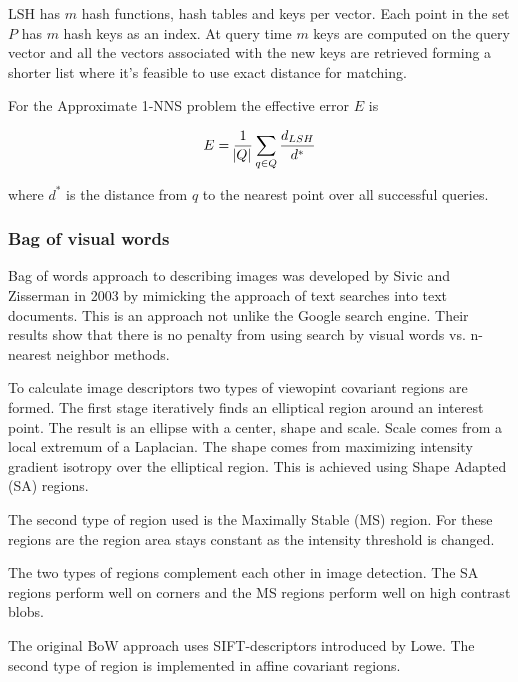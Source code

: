 \documentclass[english,12pt,a4paper,pdftex,elec,utf8]{aaltothesis}
\begin{document}
LSH has $m$ hash functions, hash tables and keys per vector. Each point in the set $P$ has $m$ hash keys as an index. At query time $m$ keys are computed on the query vector and all the vectors associated with the new keys are retrieved forming a shorter list where it's feasible to use exact distance for matching.





For the Approximate 1-NNS problem the effective error $E$ is

\begin{equation}
  \label{lsherroreq}
E = \frac{1}{\abs{Q}}\sum_{q\in Q}\frac{d_{LSH}}{d^*}
  \end{equation}

where $d^*$ is the distance from $q$ to the nearest point over all successful queries.


\subsubsection{Bag of visual words}\label{BOW}
Bag of words approach to describing images was developed by Sivic and Zisserman in 2003 by mimicking the approach of text searches into text documents. This is an approach not unlike the Google search engine. Their results show that there is no penalty from using search by visual words vs. n-nearest neighbor methods.\cite{Sivic2003}

To calculate image descriptors two types of viewopint covariant regions are formed. The first stage iteratively finds an elliptical region around an interest point. The result is an ellipse with a center, shape and scale. Scale comes from a local extremum of a Laplacian. The shape comes from maximizing intensity gradient isotropy over the elliptical region. This is achieved using Shape Adapted (SA) regions.\cite{Sivic2003}

The second type of region used is the Maximally Stable (MS) region. For these regions are the region area stays constant as the intensity threshold is changed.

The two types of regions complement each other in image detection. The SA regions perform well on corners and the MS regions perform well on high contrast blobs. \cite{Sivic2003}

The original BoW approach uses SIFT-descriptors introduced by Lowe. The second type of region is implemented in affine covariant regions.
\end{document}
